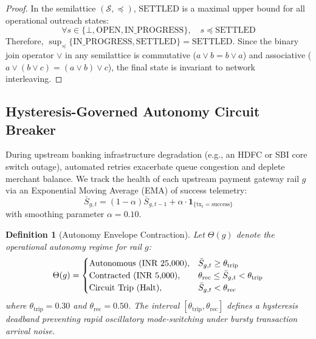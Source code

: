 \documentclass[10pt, twocolumn, a4paper]{article}
\newcommand{\INR}{\text{INR~}}
\newtheorem{definition}{Definition}
\begin{document}
\begin{proof}
In the semilattice $(\mathcal{S}, \preceq)$, $\text{SETTLED}$ is a maximal upper bound for all operational outreach states:
\begin{equation}
  \forall s \in \{\bot, \text{OPEN}, \text{IN\_PROGRESS}\}, \quad s \preceq \text{SETTLED}
\end{equation}
Therefore, $\sup_{\preceq}\{\text{IN\_PROGRESS}, \text{SETTLED}\} = \text{SETTLED}$. Since the binary join operator $\vee$ in any semilattice is commutative ($a \vee b = b \vee a$) and associative ($a \vee (b \vee c) = (a \vee b) \vee c$), the final state is invariant to network interleaving.
\end{proof}

\subsection{Hysteresis-Governed Autonomy Circuit Breaker}

During upstream banking infrastructure degradation (e.g., an HDFC or SBI core switch outage), automated retries exacerbate queue congestion and deplete merchant balance. We track the health of each upstream payment gateway rail $g$ via an Exponential Moving Average (EMA) of success telemetry:
\begin{equation}
  \bar{S}_{g, t} = (1 - \alpha)\bar{S}_{g, t-1} + \alpha \cdot \mathbf{1}_{\{\text{tx}_t = \text{success}\}}
\end{equation}
with smoothing parameter $\alpha = 0.10$.

\begin{definition}[Autonomy Envelope Contraction]
Let $\Theta(g)$ denote the operational autonomy regime for rail $g$:
\begin{equation}
  \Theta(g) = 
  \begin{cases}
    \text{Autonomous (\INR 25,000)}, & \bar{S}_{g, t} \ge \theta_{\text{trip}} \\
    \text{Contracted (\INR 5,000)}, & \theta_{\text{rec}} \le \bar{S}_{g, t} < \theta_{\text{trip}} \\
    \text{Circuit Trip (Halt)}, & \bar{S}_{g, t} < \theta_{\text{rec}}
  \end{cases}
\end{equation}
where $\theta_{\text{trip}} = 0.30$ and $\theta_{\text{rec}} = 0.50$. The interval $[\theta_{\text{trip}}, \theta_{\text{rec}}]$ defines a hysteresis deadband preventing rapid oscillatory mode-switching under bursty transaction arrival noise.
\end{definition}
\end{document}
